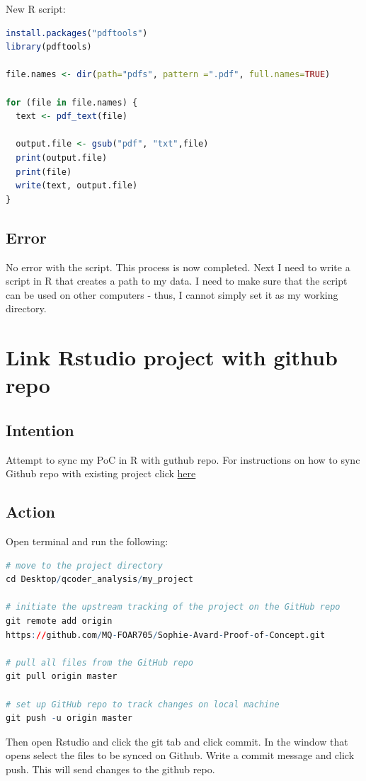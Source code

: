 \documentclass{article}
\begin{document}
New R script:
\begin{lstlisting}[language=R]
install.packages("pdftools")
library(pdftools)

file.names <- dir(path="pdfs", pattern =".pdf", full.names=TRUE)

for (file in file.names) {
  text <- pdf_text(file)

  output.file <- gsub("pdf", "txt",file)
  print(output.file)
  print(file)
  write(text, output.file)
}
\end{lstlisting}

\subsection{Error}
No error with the script. This process is now completed. Next I need to write a script in R that creates a path to my data. I need to make sure that the script can be used on other computers - thus, I cannot simply set it as my working directory. 

\section{Link Rstudio project with github repo}
\subsection{Intention}
Attempt to sync my PoC in R with guthub repo. For instructions on how to sync Github repo with existing project click \href{https://hansenjohnson.org/post/sync-github-repository-with-existing-r-project/}{here}

\subsection{Action}
Open terminal and run the following:
\begin{lstlisting}[language=R]
# move to the project directory
cd Desktop/qcoder_analysis/my_project

# initiate the upstream tracking of the project on the GitHub repo
git remote add origin 
https://github.com/MQ-FOAR705/Sophie-Avard-Proof-of-Concept.git

# pull all files from the GitHub repo
git pull origin master

# set up GitHub repo to track changes on local machine
git push -u origin master
\end{lstlisting}

Then open Rstudio and click the git tab and click commit. In the window that opens select the files to be synced on Github. Write a commit message and click push. This will send changes to the github repo. 
\end{document}

